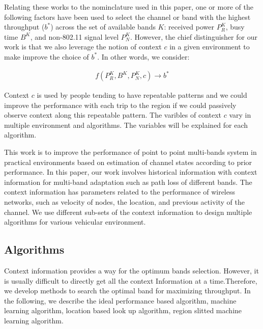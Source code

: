 Relating these works to the nominclature used in this paper, one or more
of the following factors have been used to select the channel or band
with the highest throughput ($b^*$) across the set of available bands
$K$: received power $P_R^K$, busy 
time $B^K$, and non-802.11 signal level $P_N^K$. However, the 
chief distinguisher for our work is that we also leverage 
the notion of context $c$ in a given environment to make
improve the choice of $b^*$.  In other words, we consider:

\begin{align}
\label{eqn:performance}
f(P_R^K,B^K,P_N^K,c) \rightarrow b^*
\end{align}

Context $c$ is used by people tending to have repeatable patterns \cite{meikle2012globali} and we could improve the performance with each trip to the region if we could passively observe context along this repeatable pattern. The varibles of context $c$ vary in multiple environment and algorithms. The variables will be explained for each algorithm. 




	  This work is to improve the performance of point to point multi-bands system in practical environments based on estimation of channel states according to prior performance.
	  In this paper, our work involves historical information with context information for multi-band adaptation such as path loss of different bands.
	  The context information has parameters related to the performance of wireless networks, such as velocity of nodes, the location, and previous activity of the channel.
	  We use different sub-sets of the context information to design multiple algorithms for various vehicular environment. 



	  \subsection{Algorithms}
	  \label{subsec:algorithms}

	  Context information provides a way for the optimum bands selection. However, it is usually difficult to directly get all the context Information at a time.Therefore, we develop methods to search the optimal band for maximizing throughput. In the following, we describe the ideal performance based algorithm, machine learning algorithm, location based look up algorithm, region slitted machine learning algorithm.

